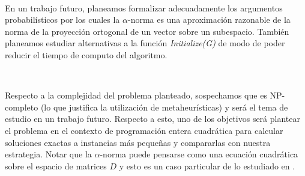 \documentclass[conference,compsoc,a4paper]{IEEEtran}
\begin{document}
\

En un trabajo futuro, planeamos formalizar adecuadamente los argumentos 
probabilísticos por los cuales la $\alpha$-norma es una aproximación 
razonable de la norma de la proyección ortogonal de un vector sobre un subespacio.
También planeamos estudiar alternativas a la función \emph{Initialize(G)}
de modo de poder reducir el tiempo de computo del algoritmo.

\ 

Respecto a la complejidad del problema planteado, sospechamos que
es NP-completo (lo que justifica la utilización de metaheurísticas)
y será el tema de estudio en un trabajo futuro.
Respecto a esto, uno de los objetivos será plantear el problema
en el contexto de programación entera cuadrática para calcular soluciones exactas a instancias más pequeñas
y compararlas con nuestra estrategia.
Notar que la $\alpha$-norma puede pensarse como una ecuación cuadrática
sobre el espacio de matrices $D$ y esto es un caso particular
de lo estudiado en \cite{MA:1976}.

%
%

\end{document}
